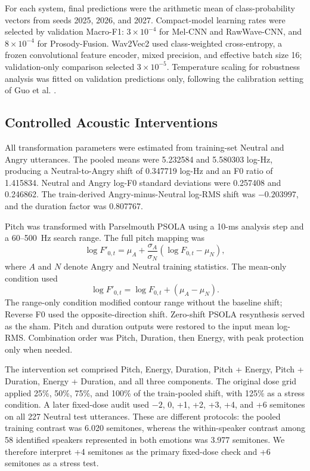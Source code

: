 \documentclass[a4paper,runningheads]{llncs}
\begin{document}
For each system, final predictions were the arithmetic mean of class-probability vectors from seeds 2025, 2026, and 2027. Compact-model learning rates were selected by validation Macro-F1: $3\times10^{-4}$ for Mel-CNN and RawWave-CNN, and $8\times10^{-4}$ for Prosody-Fusion. Wav2Vec2 used class-weighted cross-entropy, a frozen convolutional feature encoder, mixed precision, and effective batch size 16; validation-only comparison selected $3\times10^{-5}$. Temperature scaling for robustness analysis was fitted on validation predictions only, following the calibration setting of Guo et al. \cite{guo2017calibration}.

\subsection{Controlled Acoustic Interventions}

All transformation parameters were estimated from training-set Neutral and Angry utterances. The pooled means were 5.232584 and 5.580303 log-Hz, producing a Neutral-to-Angry shift of 0.347719 log-Hz and an F0 ratio of 1.415834. Neutral and Angry log-F0 standard deviations were 0.257408 and 0.246862. The train-derived Angry-minus-Neutral log-RMS shift was $-0.203997$, and the duration factor was 0.807767.

Pitch was transformed with Parselmouth PSOLA using a 10-ms analysis step and a 60--500~Hz search range. The full pitch mapping was
\begin{equation}
\log F'_{0,t}=\mu_A+\frac{\sigma_A}{\sigma_N}\left(\log F_{0,t}-\mu_N\right),
\end{equation}
where $A$ and $N$ denote Angry and Neutral training statistics. The mean-only condition used
\begin{equation}
\log F'_{0,t}=\log F_{0,t}+(\mu_A-\mu_N).
\end{equation}
The range-only condition modified contour range without the baseline shift; Reverse F0 used the opposite-direction shift. Zero-shift PSOLA resynthesis served as the sham. Pitch and duration outputs were restored to the input mean log-RMS. Combination order was Pitch, Duration, then Energy, with peak protection only when needed.

The intervention set comprised Pitch, Energy, Duration, Pitch + Energy, Pitch + Duration, Energy + Duration, and all three components. The original dose grid applied 25\%, 50\%, 75\%, and 100\% of the train-pooled shift, with 125\% as a stress condition. A later fixed-dose audit used $-2$, 0, +1, +2, +3, +4, and +6 semitones on all 227 Neutral test utterances. These are different protocols: the pooled training contrast was 6.020 semitones, whereas the within-speaker contrast among 58 identified speakers represented in both emotions was 3.977 semitones. We therefore interpret +4 semitones as the primary fixed-dose check and +6 semitones as a stress test.
\end{document}

